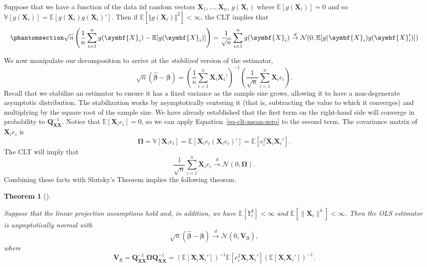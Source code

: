 \documentclass[
  13pt,
  letterpaper,
  DIV=11,
  numbers=noendperiod]{scrreprt}
\newcommand{\mb}{\symbf}
\newcommand{\E}{\mathbb{E}}
\newcommand{\V}{\mathbb{V}}
\newcommand{\N}{\mathcal{N}}
\newcommand{\X}{\mb{X}}
\newcommand{\bfbeta}{\mb{\beta}}
\newcommand{\bhat}{\widehat{\mb{\beta}}}
\newcommand{\indist}{\overset{d}{\to}}
\theoremstyle{plain}
\newtheorem{theorem}{Theorem}[chapter]
\theoremstyle{definition}
\theoremstyle{definition}
\theoremstyle{remark}
\begin{document}
\begin{tcolorbox}[enhanced jigsaw, title=\textcolor{quarto-callout-note-color}{\faInfo}\hspace{0.5em}{CLT reminder}, breakable, colbacktitle=quarto-callout-note-color!10!white, toptitle=1mm, colback=white, arc=.35mm, left=2mm, opacityback=0, titlerule=0mm, colframe=quarto-callout-note-color-frame, leftrule=.75mm, coltitle=black, opacitybacktitle=0.6, bottomtitle=1mm, rightrule=.15mm, bottomrule=.15mm, toprule=.15mm]

Suppose that we have a function of the data iid random vectors
\(\X_1, \ldots, \X_n\), \(g(\X_{i})\) where \(\E[g(\X_{i})] = 0\) and so
\(\V[g(\X_{i})] = \E[g(\X_{i})g(\X_{i})']\). Then if
\(\E[\Vert g(\X_{i})\Vert^{2}] < \infty\), the CLT implies that
\begin{equation}\phantomsection\label{eq-clt-mean-zero}{ 
\sqrt{n}\left(\frac{1}{n} \sum_{i=1}^{n} g(\X_{i}) - \E[g(\X_{i})]\right) = \frac{1}{\sqrt{n}} \sum_{i=1}^{n} g(\X_{i}) \indist \N(0, \E[g(\X_{i})g(\X_{i}')]) 
}\end{equation}

\end{tcolorbox}

We now manipulate our decomposition to arrive at the \emph{stabilized}
version of the estimator, \[ 
\sqrt{n}\left( \bhat - \bfbeta\right) = \left( \frac{1}{n} \sum_{i=1}^n \X_i\X_i' \right)^{-1} \left( \frac{1}{\sqrt{n}} \sum_{i=1}^n \X_ie_i \right).
\] Recall that we stabilize an estimator to ensure it has a fixed
variance as the sample size grows, allowing it to have a non-degenerate
asymptotic distribution. The stabilization works by asymptotically
centering it (that is, subtracting the value to which it converges) and
multiplying by the square root of the sample size. We have already
established that the first term on the right-hand side will converge in
probability to \(\mb{Q}_{\X\X}^{-1}\). Notice that
\(\E[\X_{i}e_{i}] = 0\), so we can apply Equation~\ref{eq-clt-mean-zero}
to the second term. The covariance matrix of \(\X_ie_{i}\) is \[ 
\mb{\Omega} = \V[\X_{i}e_{i}] = \E[\X_{i}e_{i}(\X_{i}e_{i})'] = \E[e_{i}^{2}\X_{i}\X_{i}'].
\] The CLT will imply that \[ 
\frac{1}{\sqrt{n}} \sum_{i=1}^n \X_ie_i \indist \N(0, \mb{\Omega}).
\] Combining these facts with Slutsky's Theorem implies the following
theorem.

\begin{theorem}[]\protect\hypertarget{thm-ols-asymptotic-normality}{}\label{thm-ols-asymptotic-normality}

Suppose that the linear projection assumptions hold and, in addition, we
have \(\E[Y_{i}^{4}] < \infty\) and
\(\E[\lVert\X_{i}\rVert^{4}] < \infty\). Then the OLS estimator is
asymptotically normal with \[ 
\sqrt{n}\left( \bhat - \bfbeta\right) \indist \N(0, \mb{V}_{\bfbeta}),
\] where \[ 
\mb{V}_{\bfbeta} = \mb{Q}_{\X\X}^{-1}\mb{\Omega}\mb{Q}_{\X\X}^{-1} = \left( \E[\X_i\X_i'] \right)^{-1}\E[e_i^2\X_i\X_i']\left( \E[\X_i\X_i'] \right)^{-1}.
\]

\end{theorem}
\end{document}
